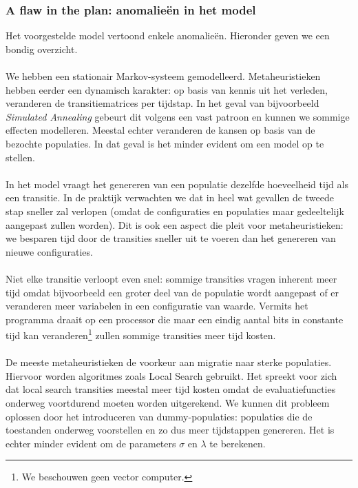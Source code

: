 \subsubsection{A flaw in the plan: anomalie\"en in het model}

Het voorgestelde model vertoond enkele anomalie\"en. Hieronder geven we een bondig overzicht.

\paragraph{}
We hebben een stationair Markov-systeem gemodelleerd. Metaheuristieken hebben eerder een dynamisch karakter: op basis van kennis uit het verleden, veranderen de transitiematrices per tijdstap. In het geval van bijvoorbeeld \emph{Simulated Annealing} gebeurt dit volgens een vast patroon en kunnen we sommige effecten modelleren. Meestal echter veranderen de kansen op basis van de bezochte populaties. In dat geval is het minder evident om een model op te stellen.

\paragraph{}
In het model vraagt het genereren van een populatie dezelfde hoeveelheid tijd als een transitie. In de praktijk verwachten we dat in heel wat gevallen de tweede stap sneller zal verlopen (omdat de configuraties en populaties maar gedeeltelijk aangepast zullen worden). Dit is ook een aspect die pleit voor metaheuristieken: we besparen tijd door de transities sneller uit te voeren dan het genereren van nieuwe configuraties.

\paragraph{}
Niet elke transitie verloopt even snel: sommige transities vragen inherent meer tijd omdat bijvoorbeeld een groter deel van de populatie wordt aangepast of er veranderen meer variabelen in een configuratie van waarde. Vermits het programma draait op een processor die maar een eindig aantal bits in constante tijd kan veranderen\footnote{We beschouwen geen vector computer.} zullen sommige transities meer tijd kosten.

\paragraph{}
De meeste metaheuristieken de voorkeur aan migratie naar sterke populaties. Hiervoor worden algoritmes zoals Local Search gebruikt. Het spreekt voor zich dat local search transities meestal meer tijd kosten omdat de evaluatiefuncties onderweg voortdurend moeten worden uitgerekend. We kunnen dit probleem oplossen door het introduceren van dummy-populaties: populaties die de toestanden onderweg voorstellen en zo dus meer tijdstappen genereren. Het is echter minder evident om de parameters $\sigma$ en $\lambda$ te berekenen.

